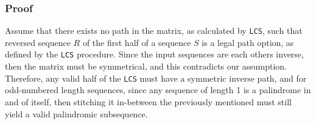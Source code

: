 \documentclass[11pt,english]{article}
\begin{document}
\subsubsection*{Proof}
%

Assume that there exists no path in the matrix, as calculated by \texttt{LCS},
such that reversed sequence $R$ of the first half of a sequence $S$ is a legal
path option, as defined by the \texttt{LCS} procedure. Since the input
sequences are each others inverse, then the matrix must be symmetrical, and
this contradicts our assumption. Therefore, any valid half of the \texttt{LCS}
must have a symmetric inverse path, and for odd-numbered length sequences,
since any sequence of length 1 is a palindrome in and of itself, then
stitching it in-between the previously mentioned must still yield a valid
palindromic subsequence.








\end{document}
